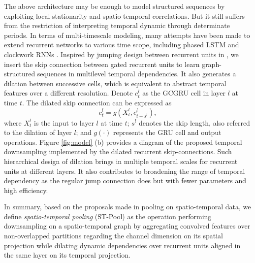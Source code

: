 \documentclass[sigconf,screen]{acmart}
\begin{document}
The above architecture may be enough to model structured sequences by exploiting local stationarity and spatio-temporal correlations. But it still suffers from the restriction of interpreting temporal dynamic through determinate periods. In terms of multi-timescale modeling, many attempts have been made to extend recurrent networks to various time scope, including phased LSTM \cite{neil2016phased} and clockwork RNNs \cite{koutnik2014clockwork}. Inspired by jumping design between recurrent units in \cite{chang2017dilated}, we insert the skip connection between gated recurrent units to learn graph-structured sequences in multilevel temporal dependencies. It also generates a dilation between successive cells, which is equivalent to abstract temporal features over a different resolution. Denote $c_t^l$ as the GCGRU cell in layer $l$ at time $t$. The dilated skip connection can be expressed as
\begin{equation}
c _ { t } ^ {l} = g \left( X _ { t } ^ {l} , c _ { {t - s}^l } ^ {l} \right),
\end{equation}
where $X_t^{l}$ is the input to layer $l$ at time $t$; $s^{l}$ denotes the skip length, also referred to the dilation of layer $l$; and $g(\cdot)$ represents the GRU cell and output operations. Figure \ref{fig:model} (b) provides a diagram of the proposed temporal downsampling implemented by the dilated recurrent skip-connections. Such hierarchical design of dilation brings in multiple temporal scales for recurrent units at different layers. It also contributes to broadening the range of temporal dependency as the regular jump connection does but with fewer parameters and high efficiency.

In summary, based on the proposals made in pooling on spatio-temporal data, we define \emph{spatio-temporal pooling} (ST-Pool) as the operation performing downsampling on a spatio-temporal graph by aggregating convolved features over non-overlapped partitions regarding the channel dimension on its spatial projection while dilating dynamic dependencies over recurrent units aligned in the same layer on its temporal projection.
\end{document}
